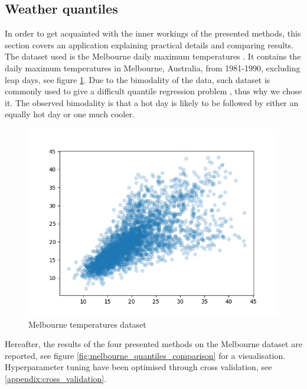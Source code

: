 \subsection{Weather quantiles}
In order to get acquainted with the inner workings of the presented methods, this section covers an application explaining practical details and comparing results.
\\
The dataset used is the Melbourne daily maximum temperatures \cite{hdrcde}. It contains the daily maximum temperatures in Melbourne, Australia, from 1981-1990, excluding leap days, see figure \ref{fig:melbourne_temperature_data}.
Due to the bimodality of the data, such dataset is commonly used to give a difficult quantile regression problem \cite{hyndman1996estimating}, thus why we chose it. The observed bimodality is that a hot day is likely to be followed by either an equally hot day or one much cooler.
\begin{figure}[!h]
    \includegraphics[width=\textwidth]{images/melbourne_temperature.png}
    \caption{Melbourne temperatures dataset}
    \label{fig:melbourne_temperature_data}
\end{figure}
Hereafter, the results of the four presented methods on the Melbourne dataset are reported, see figure \ref{fig:melbourne_quantiles_comparison} for a visualisation. Hyperparameter tuning have been optimised through cross validation, see \ref{appendix:cross_validation}.
